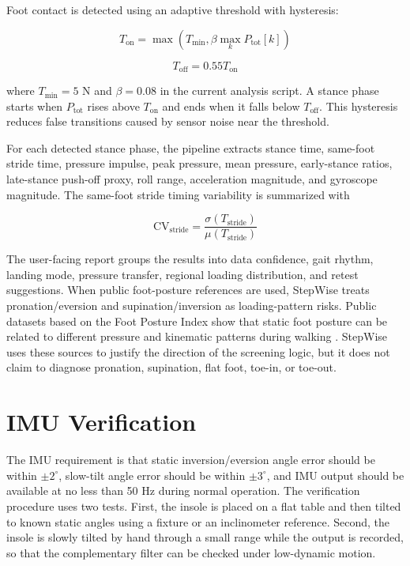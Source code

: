 Foot contact is detected using an adaptive threshold with hysteresis:

\begin{equation}
T_{\mathrm{on}} =
\max\left(T_{\min},\beta\max_k P_{\mathrm{tot}}[k]\right)
\label{eq:contact_on}
\end{equation}

\begin{equation}
T_{\mathrm{off}} = 0.55T_{\mathrm{on}}
\label{eq:contact_off}
\end{equation}

where $T_{\min}=5$ N and $\beta=0.08$ in the current analysis script. A stance phase starts when $P_{\mathrm{tot}}$ rises above $T_{\mathrm{on}}$ and ends when it falls below $T_{\mathrm{off}}$. This hysteresis reduces false transitions caused by sensor noise near the threshold.

For each detected stance phase, the pipeline extracts stance time, same-foot stride time, pressure impulse, peak pressure, mean pressure, early-stance ratios, late-stance push-off proxy, roll range, acceleration magnitude, and gyroscope magnitude. The same-foot stride timing variability is summarized with

\begin{equation}
\mathrm{CV}_{\mathrm{stride}} =
\frac{\sigma(T_{\mathrm{stride}})}
{\mu(T_{\mathrm{stride}})}
\label{eq:stride_cv}
\end{equation}

The user-facing report groups the results into data confidence, gait rhythm, landing mode, pressure transfer, regional loading distribution, and retest suggestions. When public foot-posture references are used, StepWise treats pronation/eversion and supination/inversion as loading-pattern risks. Public datasets based on the Foot Posture Index show that static foot posture can be related to different pressure and kinematic patterns during walking \cite{sanchis_foot_dataset,redmond_fpi}. StepWise uses these sources to justify the direction of the screening logic, but it does not claim to diagnose pronation, supination, flat foot, toe-in, or toe-out.

\section{IMU Verification}
\label{sec:imu_verification}

The IMU requirement is that static inversion/eversion angle error should be within $\pm 2^\circ$, slow-tilt angle error should be within $\pm 3^\circ$, and IMU output should be available at no less than 50 Hz during normal operation. The verification procedure uses two tests. First, the insole is placed on a flat table and then tilted to known static angles using a fixture or an inclinometer reference. Second, the insole is slowly tilted by hand through a small range while the output is recorded, so that the complementary filter can be checked under low-dynamic motion.

